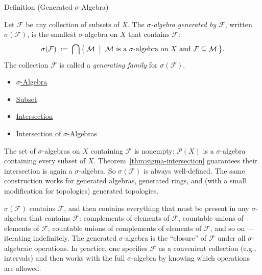 \begin{definitionbox}{Definition (Generated $\sigma$-Algebra)}
\begin{definition}\label{def:generated-sigma}
Let $\mathcal{F}$ be any collection of subsets of $X$. The
\emph{$\sigma$-algebra generated by $\mathcal{F}$}, written $\sigma(\mathcal{F})$,
is the smallest $\sigma$-algebra on $X$ that contains $\mathcal{F}$:
\[
\sigma(\mathcal{F})
\;:=\;
\bigcap\,\bigl\{\, \mathcal{M} \;\bigm|\;
\mathcal{M} \text{ is a $\sigma$-algebra on } X
\text{ and } \mathcal{F} \subseteq \mathcal{M} \,\bigr\}.
\]
The collection $\mathcal{F}$ is called a \emph{generating family} for
$\sigma(\mathcal{F})$.
\end{definition}
\end{definitionbox}

\begin{dependencies}
\begin{itemize}
  \item \hyperref[def:sigma-algebra]{$\sigma$-Algebra}
  \item \hyperref[def:subset]{Subset}
  \item \hyperref[def:intersection]{Intersection}
  \item \hyperref[thm:sigma-intersection]{Intersection of $\sigma$-Algebras}
\end{itemize}
\end{dependencies}

\begin{remark*}
The set of $\sigma$-algebras on $X$ containing $\mathcal{F}$ is nonempty:
$\mathcal{P}(X)$ is a $\sigma$-algebra containing every subset of $X$.
Theorem~\ref{thm:sigma-intersection} guarantees their intersection is again a
$\sigma$-algebra. So $\sigma(\mathcal{F})$ is always well-defined. The same
construction works for generated algebras, generated rings, and (with a small
modification for topologies) generated topologies.
\end{remark*}

\begin{remark*}
$\sigma(\mathcal{F})$ contains $\mathcal{F}$, and then contains everything
that must be present in any $\sigma$-algebra that contains $\mathcal{F}$:
complements of elements of $\mathcal{F}$, countable unions of elements of
$\mathcal{F}$, countable unions of complements of elements of $\mathcal{F}$,
and so on --- iterating indefinitely. The generated $\sigma$-algebra is the
``closure'' of $\mathcal{F}$ under all $\sigma$-algebraic operations. In
practice, one specifies $\mathcal{F}$ as a convenient collection (e.g.,
intervals) and then works with the full $\sigma$-algebra by knowing which
operations are allowed.
\end{remark*}

